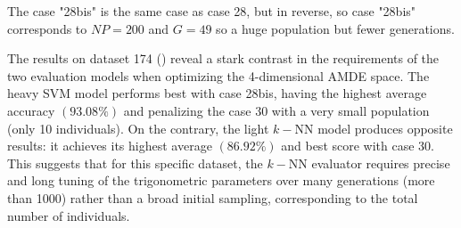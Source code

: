 \documentclass[12pt, openany]{article}
\begin{document}
The case "28bis" is the same case as case 28, but in reverse, so case "28bis" corresponds to $NP=200$ and $G=49$ so a huge population but fewer generations.

The results on dataset 174 () reveal a stark contrast in the requirements of the two evaluation models when optimizing the 4-dimensional AMDE space. The heavy SVM model performs best with case 28bis, having the highest average accuracy $(93.08\%)$ and penalizing the case 30 with a very small population (only 10 individuals). On the contrary, the light $k-$NN model produces opposite results: it achieves its highest average $(86.92\%)$ and best score with case 30. This suggests that for this specific dataset, the $k-$NN evaluator requires precise and long tuning of the trigonometric parameters over many generations (more than 1000) rather than a broad initial sampling, corresponding to the total number of individuals.
\end{document}
